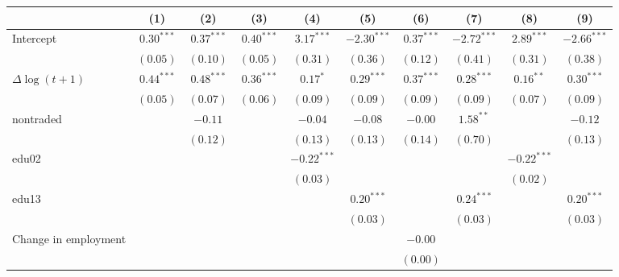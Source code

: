 
\begin{tabular}{l c c c c c c c c c }
\hline
 & (1) & (2) & (3) & (4) & (5) & (6) & (7) & (8) & (9) \\
\hline
Intercept          & $0.30^{***}$ & $0.37^{***}$ & $0.40^{***}$ & $3.17^{***}$  & $-2.30^{***}$ & $0.37^{***}$ & $-2.72^{***}$ & $2.89^{***}$  & $-2.66^{***}$ \\
                     & $(0.05)$     & $(0.10)$     & $(0.05)$     & $(0.31)$      & $(0.36)$      & $(0.12)$     & $(0.41)$      & $(0.31)$      & $(0.38)$      \\
$\Delta \log(t+1)$              & $0.44^{***}$ & $0.48^{***}$ & $0.36^{***}$ & $0.17^{*}$    & $0.29^{***}$  & $0.37^{***}$ & $0.28^{***}$  & $0.16^{**}$   & $0.30^{***}$  \\
                     & $(0.05)$     & $(0.07)$     & $(0.06)$     & $(0.09)$      & $(0.09)$      & $(0.09)$     & $(0.09)$      & $(0.07)$      & $(0.09)$      \\
nontraded            &              & $-0.11$      &              & $-0.04$       & $-0.08$       & $-0.00$      & $1.58^{**}$   &               & $-0.12$       \\
                     &              & $(0.12)$     &              & $(0.13)$      & $(0.13)$      & $(0.14)$     & $(0.70)$      &               & $(0.13)$      \\
edu02                &              &              &              & $-0.22^{***}$ &               &              &               & $-0.22^{***}$ &               \\
                     &              &              &              & $(0.03)$      &               &              &               & $(0.02)$      &               \\
edu13                &              &              &              &               & $0.20^{***}$  &              & $0.24^{***}$  &               & $0.20^{***}$  \\
                     &              &              &              &               & $(0.03)$      &              & $(0.03)$      &               & $(0.03)$      \\
Change in employment              &              &              &              &               &               & $-0.00$      &               &               &               \\
                     &              &              &              &               &               & $(0.00)$     &               &               &               \\

\end{tabular}
